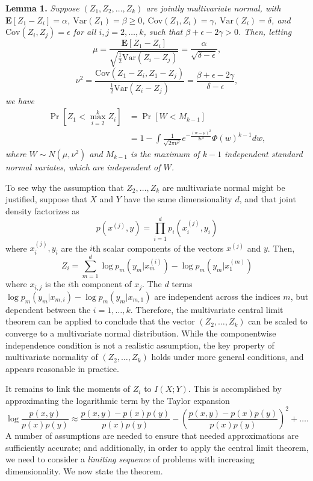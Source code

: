 \documentclass{article}
\newcommand{\E}{\textbf{E}}
\newcommand{\Cov}{\text{Cov}}
\newcommand{\Var}{\text{Var}}
\begin{document}
\textbf{Lemma 1. }
\emph{
Suppose $(Z_1, Z_2, \hdots, Z_k)$ are jointly multivariate normal, with 
$\E[Z_1 - Z_i]= \alpha$, 
$\Var(Z_1) = \beta \geq 0$, 
$\Cov(Z_1, Z_i) = \gamma$, 
$\Var(Z_i)= \delta$, and $\Cov(Z_i, Z_j) = \epsilon$ for all $i, j = 2, \hdots,
k$, such that $\beta + \epsilon - 2\gamma > 0$.  Then, letting
\[
\mu = \frac{\E[Z_1 - Z_i]}{\sqrt{\frac{1}{2}\Var(Z_i - Z_j)}} = \frac{\alpha}{\sqrt{\delta - \epsilon}},
\]
\[
\nu^2 = \frac{\Cov(Z_1 -Z_i, Z_1 - Z_j)}{\frac{1}{2}\Var(Z_i - Z_j)} = \frac{\beta + \epsilon - 2\gamma}{\delta - \epsilon},
\]
we have
\begin{align*}
\Pr[Z_1 < \max_{i=2}^k Z_i] &= \Pr[W < M_{k-1}]
\\&= 1 - \int \frac{1}{\sqrt{2\pi\nu^2}} e^{-\frac{(w-\mu)^2}{2\nu^2}} \Phi(w)^{k-1} dw,
\end{align*}
where $W \sim N(\mu, \nu^2)$ and $M_{k-1}$ is the maximum of $k-1$
independent standard normal variates, which are independent of $W$.
}

To see why the assumption that $Z_2,\hdots, Z_k$ are multivariate normal might be justified, suppose that $X$ and $Y$ have the same dimensionality $d$, and that
joint density factorizes as
\[
p(x^{(j)}, y) = \prod_{i=1}^d p_i(x^{(j)}_i, y_i)
\]
where $x_i^{(j)}, y_i$ are the $i$th scalar components of the vectors $x^{(j)}$ and $y$.
Then,
\[
Z_i = \sum_{m=1}^d \log p_m(y_m | x^{(i)}_m) - \log p_m(y_m | x^{(m)}_1)
\]
where $x_{i, j}$ is the $i$th component of $x_j$.
The $d$ terms $\log p_m(y_m | x_{m, i}) - \log p_m(y_m | x_{m, 1})$ are independent across the indices $m$,
but dependent between the $i = 1,\hdots, k$.
Therefore, the multivariate central limit theorem can be applied to conclude that the vector
$(Z_2,\hdots, Z_k)$ can be scaled to converge to a multivariate normal distribution.
While the componentwise independence condition is not a realistic assumption,
the key property of multivariate normality of $(Z_2,\hdots, Z_k)$ holds under more general conditions, and appears reasonable in practice.  

It remains to link the moments of $Z_i$ to $I(X;Y)$.  This is accomplished by approximating the logarithmic term by the Taylor expansion
\[
\log \frac{p(x, y)}{p(x) p(y)} \approx \frac{p(x, y) - p(x) p(y)}{p(x) p(y)} - \left(\frac{p(x, y) - p(x) p(y)}{p(x) p(y)}\right)^2 + \hdots.
\]
A number of assumptions are needed to ensure that needed approximations are sufficiently accurate;
and additionally,  in order to apply the central limit theorem, we need to consider a \emph{limiting sequence} of problems with increasing dimensionality.  We now state the theorem.
\end{document}
